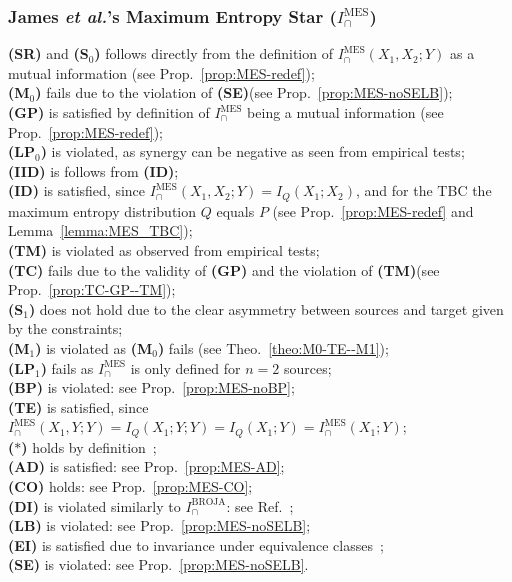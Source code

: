 \documentclass{article}
\makeatletter
\newcommand{\etalx}{\textit{et al.\@}\xspace}
\newcommand{\ts}[1]{\ensuremath{_{\text{#1}}}}
\newcommand{\SR}{\textbf{(SR)}\xspace} %
\newcommand{\Sz}{\textbf{(S\ts{0})}\xspace} %
\newcommand{\Mz}{\textbf{(M\ts{0})}\xspace} %
\newcommand{\GP}{\textbf{(GP)}\xspace} %
\newcommand{\LPz}{\textbf{(LP\ts{0})}\xspace} %
\newcommand{\ID}{\textbf{(ID)}\xspace} %
\newcommand{\IID}{\textbf{(IID)}\xspace} %
\newcommand{\TM}{\textbf{(TM)}\xspace} %
\newcommand{\TC}{\textbf{(TC)}\xspace} %
\newcommand{\So}{\textbf{(S\ts{1})}\xspace} %
\newcommand{\Mo}{\textbf{(M\ts{1})}\xspace} %
\newcommand{\LPo}{\textbf{(LP\ts{1})}\xspace} %
\newcommand{\BP}{\textbf{(BP)}\xspace} %
\newcommand{\TE}{\textbf{(TE)}\xspace} %
\newcommand{\AST}{\textbf{($\boldsymbol{\ast}$)}\xspace} %
\newcommand{\AD}{\textbf{(AD)}\xspace} %
\newcommand{\CO}{\textbf{(CO)}\xspace} %
\newcommand{\LB}{\textbf{(LB)}\xspace} %
\newcommand{\EI}{\textbf{(EI)}\xspace} %
\newcommand{\SE}{\textbf{(SE)}\xspace} %
\newcommand{\DI}{\textbf{(DI)}\xspace}
\newcommand{\IBROJA}{\ensuremath{I_\cap^{\text{BROJA}}}\xspace}
\newcommand{\IMES}{\ensuremath{I_\cap^{\text{MES}}}\xspace}
\newcommand{\IMESs}{\ensuremath{I_\cap^{\text{MES}}(X_1,X_2;Y)}\xspace}
\makeatother
\begin{document}
\subsubsection*{James \etalx's Maximum Entropy Star ($\IMES$)}
    \SR and \Sz follows directly from the definition of $\IMESs$ as a mutual information (see Prop.~\ref{prop:MES-redef}); \\
    \Mz fails due to the violation of \SE (see Prop.~\ref{prop:MES-noSELB}); \\
    \GP is satisfied by definition of $\IMES$ being a mutual information (see Prop.~\ref{prop:MES-redef}); \\
    \LPz is violated, as synergy can be negative as seen from empirical tests; \\
    \IID is follows from \ID; \\
    \ID is satisfied, since $\IMES(X_1,X_2;Y)=I_Q(X_1;X_2)$, and for the TBC the maximum entropy distribution $Q$ equals $P$ (see Prop.~\ref{prop:MES-redef} and Lemma~\ref{lemma:MES_TBC}); \\
    \TM is violated as observed from empirical tests; \\
    \TC fails due to the validity of \GP and the violation of \TM (see Prop.~\ref{prop:TC-GP--TM}); \\
    \So does not hold due to the clear asymmetry between sources and target given by the constraints; \\
    \Mo is violated as \Mz fails (see Theo.~\ref{theo:M0-TE--M1}); \\
    \LPo fails as $\IMES$ is only defined for $n=2$ sources; \\
    \BP is violated: see Prop.~\ref{prop:MES-noBP}; \\
    \TE is satisfied, since $\IMES(X_1,Y;Y)=I_Q(X_1;Y;Y)=I_Q(X_1;Y)=\IMES(X_1;Y)$; \\
    \AST holds by definition~\cite{james2018uniquekey}; \\
    \AD is satisfied: see Prop.~\ref{prop:MES-AD}; \\
    \CO holds: see Prop.~\ref{prop:MES-CO}; \\
    \DI is violated similarly to \IBROJA: see Ref.~\cite{rauh2021properties}; \\
    \LB is violated: see Prop.~\ref{prop:MES-noSELB}; \\
    \EI is satisfied due to invariance under equivalence classes~\cite{li2011connection}; \\
    \SE is violated: see Prop.~\ref{prop:MES-noSELB}.
\end{document}
